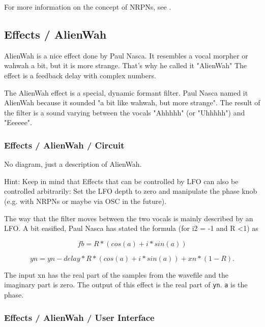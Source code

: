   For more information on the concept of NRPNs, see
   .


\subsection{Effects / AlienWah}
\label{subsec:effects_edit_alienwah}

   AlienWah is a nice effect done by Paul Nasca. It resembles a vocal morpher
   or wahwah a bit, but it is more strange. That's why he called it "AlienWah"
   The effect is a feedback delay with complex numbers.

   The AlienWah effect is a special, dynamic formant filter.
   Paul Nasca named it AlienWah because it sounded "a bit like
   wahwah, but more strange". The result of the filter is a sound varying
   between the vocals "Ahhhhh" (or "Uhhhhh") and "Eeeeee".

\subsubsection{Effects / AlienWah / Circuit}
\label{subsubsec:effects_edit_alienwah_circuit}

   No diagram, just a description of AlienWah.

   Hint: Keep in mind that Effects that can be controlled by LFO can also be
   controlled arbitrarily: Set the LFO depth to zero and manipulate the phase
   knob (e.g. with NRPNs or maybe via OSC in the future).

   The way that the filter moves between the two vocals is mainly described
   by an LFO. A bit easified, Paul Nasca has stated the formula (for
   i2 = -1 and R \textless 1) as

   \[fb=R*(cos(a)+i*sin(a))\]

   \[yn=yn-delay*R*(cos(a)+i*sin(a))+xn*(1-R).\]

   The input xn has the real part of the samples from the wavefile and the
   imaginary part is zero. The output of this effect is the real part of
   \texttt{yn}.
   \texttt{a} is the phase.

\subsubsection{Effects / AlienWah / User Interface}
\label{subsubsec:effects_edit_alienwah_ui}

